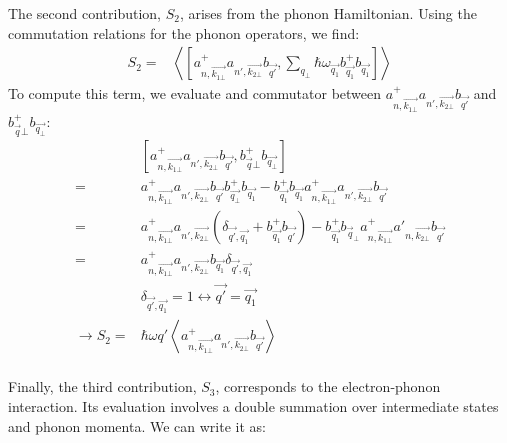 \documentclass{article}
\begin{document}
The second contribution, $S_2$, arises from the phonon Hamiltonian. Using the commutation relations for the phonon operators, we find:
\begin{align*}
        S_2 = & \left \langle \left[a^+_{n,\vec{k_{1\bot}}}a_{n',\vec{k_{2\bot}}}b_{\vec{q'}}, \sum_{q_\bot} \hbar \omega_{\vec{q_1}} b^+_{\vec{q_1}} b_{\vec{q_1}}\right] \right \rangle
\end{align*}
To compute this term, we evaluate and commutator between $a^+_{n,\vec{k_{1\bot}}}a_{n',\vec{k_{2\bot}}}b_{\vec{q'}}$ and $b^+_{\vec{q}\bot} b_{\vec{q_{\bot}}}$:
\begin{align*}
    & \left[a^+_{n,\vec{k_{1\bot}}}a_{n',\vec{k_{2\bot}}}b_{\vec{q'}},b^+_{\vec{q}\bot} b_{\vec{q_{\bot}}}\right] \\
    =& a^+_{n, \vec{k_{1\bot}}}a_{n',\vec{k_{2\bot}}}b_{\vec{q'}}b^+_{\vec{q_\bot}}b_{\vec{q_1}} -b^+_{\vec{q_1}}b_{\vec{q_1}}a^+_{n,\vec{k_{1\bot}}}a_{n', \vec{k_{2\bot}}}b_{\vec{q'}}\\
    = & a^+_{n, \vec{k_{1\bot}}} a_{n', \vec{k_{2\bot}}} \left(\delta_{\vec{q'},\vec{q_1}}+ b^+_{\vec{q_1}}b_{\vec{q'}}\right)-b^+_{\vec{q_1}}b_{\vec{q}_{\bot}} a^+_{n, \vec{k_{1\bot}}} a'_{n, \vec{k_{2\bot}}}b_{\vec{q'}} \\
    = & a^+_{n, \vec{k_{1\bot}}}a_{n', \vec{k_{2\bot}}}b_{\vec{q_1}}\delta_{\vec{q'}, \vec{q_1}} \\
    & \delta_{\vec{q'}, \vec{q_1}} = 1 \leftrightarrow \vec{q'} = \vec{q_1} \\
    \rightarrow S_2 = & \hbar \omega q' \left \langle a^+_{n, \vec{k_{1\bot}}}a_{n', \vec{k_{2\bot}}}b_{\vec{q'}}\right \rangle \\
\end{align*}

Finally, the third contribution, $S_3$, corresponds to the electron-phonon interaction. Its evaluation involves a double summation over intermediate states and phonon momenta. We can write it as:
\end{document}
